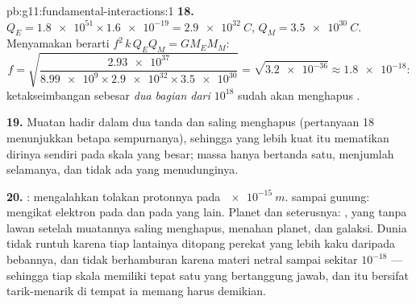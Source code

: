 \begin{solution}{pb:g11:fundamental-interactions:1}
\textbf{18.} $Q_E = \num{1.8e51} \times \num{1.6e-19} =
\qty{2.9e32}{C}$, $Q_M = \qty{3.5e30}{C}$. Menyamakan  berarti
$f^2\,k\,Q_E Q_M = G M_E M_M$:
\[
f = \sqrt{\frac{\num{2.93e37}}{\num{8.99e9} \times \num{2.9e32}
\times \num{3.5e30}}} = \sqrt{\num{3.2e-36}} \approx \num{1.8e-18} :
\]
ketakseimbangan sebesar \emph{dua bagian dari $10^{18}$} sudah akan
menghapus .

\textbf{19.} Muatan hadir dalam dua tanda dan saling menghapus
(pertanyaan 18 menunjukkan betapa sempurnanya), sehingga  yang
lebih kuat itu mematikan dirinya sendiri pada skala yang besar; massa
hanya bertanda satu, menjumlah selamanya, dan tidak ada yang
menudunginya.

\textbf{20.} :  mengalahkan tolakan protonnya
pada $\qty{e-15}{m}$.  sampai gunung: 
mengikat elektron pada  dan  pada  yang lain.
Planet dan seterusnya: , yang tanpa lawan setelah muatannya
saling menghapus, menahan planet,  dan galaksi. Dunia tidak runtuh
karena tiap lantainya ditopang perekat yang lebih kaku daripada
bebannya, dan tidak berhamburan karena materi netral sampai sekitar
$10^{-18}$ --- sehingga tiap skala memiliki tepat satu  yang
bertanggung jawab, dan  itu bersifat tarik-menarik di tempat ia
memang harus demikian.
\end{solution}
